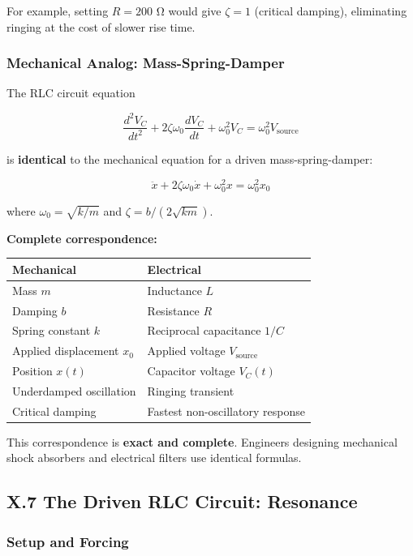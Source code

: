 \documentclass[
]{article}
\begin{document}
For example, setting \(R = 200\) Ω would give \(\zeta = 1\) (critical
damping), eliminating ringing at the cost of slower rise time.

\subsubsection{Mechanical Analog:
Mass-Spring-Damper}\label{mechanical-analog-mass-spring-damper}

The RLC circuit equation

\[\frac{d^2V_C}{dt^2} + 2\zeta\omega_0\frac{dV_C}{dt} + \omega_0^2 V_C = \omega_0^2 V_{\text{source}}\]

is \textbf{identical} to the mechanical equation for a driven
mass-spring-damper:

\[\ddot{x} + 2\zeta\omega_0\dot{x} + \omega_0^2 x = \omega_0^2 x_0\]

where \(\omega_0 = \sqrt{k/m}\) and \(\zeta = b/(2\sqrt{km})\).

\textbf{Complete correspondence:}

\begin{longtable}[]{@{}ll@{}}
\toprule\noalign{}
Mechanical & Electrical \\
\midrule\noalign{}
\endhead
\bottomrule\noalign{}
\endlastfoot
Mass \(m\) & Inductance \(L\) \\
Damping \(b\) & Resistance \(R\) \\
Spring constant \(k\) & Reciprocal capacitance \(1/C\) \\
Applied displacement \(x_0\) & Applied voltage \(V_{\text{source}}\) \\
Position \(x(t)\) & Capacitor voltage \(V_C(t)\) \\
Underdamped oscillation & Ringing transient \\
Critical damping & Fastest non-oscillatory response \\
\end{longtable}

This correspondence is \textbf{exact and complete}. Engineers designing
mechanical shock absorbers and electrical filters use identical
formulas.

\subsection{X.7 The Driven RLC Circuit:
Resonance}\label{x.7-the-driven-rlc-circuit-resonance}

\subsubsection{Setup and Forcing}\label{setup-and-forcing}
\end{document}
